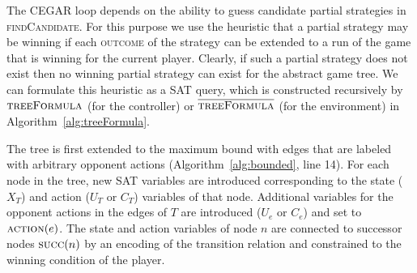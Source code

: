 \documentclass{llncs}
\newcommand{\textoverline}[1]{$\overline{\mbox{#1}}$}
\begin{document}
The CEGAR loop depends on the ability to guess candidate partial strategies in
\textsc{findCandidate}. For this purpose we use the heuristic that a partial
strategy may be winning if each \textsc{outcome} of the strategy can be
extended to a run of the game that is winning for the current player.  Clearly,
if such a partial strategy does not exist then no winning partial strategy can
exist for the abstract game tree. We can formulate this heuristic as a SAT
query, which is constructed recursively by $\textsc{treeFormula}$ (for the
controller) or $\textsc{\textoverline{treeFormula}}$ (for the environment) in
Algorithm~\ref{alg:treeFormula}.

The tree is first extended to the maximum bound with edges that are labeled
with arbitrary opponent actions (Algorithm~\ref{alg:bounded}, line 14).  For
each node in the tree, new SAT variables are introduced corresponding to the
state ($X_T$) and action ($U_T$ or $C_T$) variables of that node. Additional
variables for the opponent actions in the edges of $T$ are introduced ($U_e$ or
$C_e$) and set to $\textsc{action}(e)$.  The state and action variables of node
$n$ are connected to successor nodes $\textsc{succ}(n)$ by an encoding of the
transition relation and constrained to the winning condition of the player.



\end{document}
